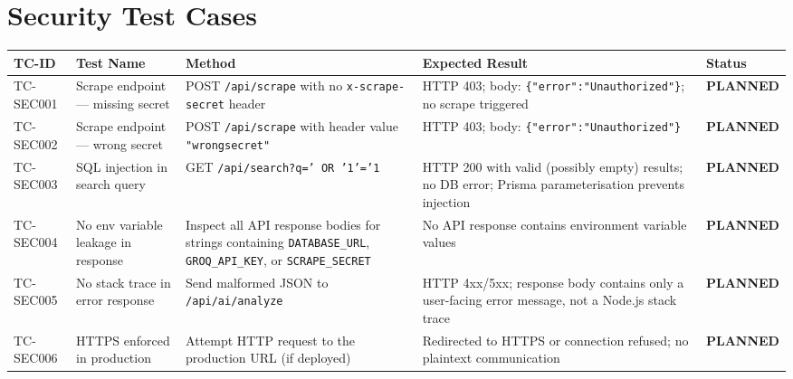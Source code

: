 \documentclass[12pt,a4paper]{report}
\newcommand{\PEND}{\textcolor{pendyellow}{\textbf{PLANNED}}}
\begin{document}
\chapter{Security Test Cases}

\begin{longtable}{C{1.6cm} L{3.5cm} L{3.5cm} L{3.5cm} C{1.5cm}}
  \toprule
  \textbf{TC-ID} & \textbf{Test Name} & \textbf{Method} & \textbf{Expected Result} & \textbf{Status} \\
  \midrule
  \endhead
  \bottomrule
  \endlastfoot

  TC-SEC001 &
    Scrape endpoint --- missing secret &
    POST \texttt{/api/scrape} with no \texttt{x-scrape-secret} header &
    HTTP 403; body: \texttt{\{"error":"Unauthorized"\}}; no scrape triggered &
    \PEND \\

  TC-SEC002 &
    Scrape endpoint --- wrong secret &
    POST \texttt{/api/scrape} with header value \texttt{"wrongsecret"} &
    HTTP 403; body: \texttt{\{"error":"Unauthorized"\}} &
    \PEND \\

  TC-SEC003 &
    SQL injection in search query &
    GET \texttt{/api/search?q=' OR '1'='1} &
    HTTP 200 with valid (possibly empty) results; no DB error; Prisma
    parameterisation prevents injection &
    \PEND \\

  TC-SEC004 &
    No env variable leakage in response &
    Inspect all API response bodies for strings containing
    \texttt{DATABASE\_URL}, \texttt{GROQ\_API\_KEY}, or \texttt{SCRAPE\_SECRET} &
    No API response contains environment variable values &
    \PEND \\

  TC-SEC005 &
    No stack trace in error response &
    Send malformed JSON to \texttt{/api/ai/analyze} &
    HTTP 4xx/5xx; response body contains only a user-facing error message,
    not a Node.js stack trace &
    \PEND \\

  TC-SEC006 &
    HTTPS enforced in production &
    Attempt HTTP request to the production URL (if deployed) &
    Redirected to HTTPS or connection refused; no plaintext communication &
    \PEND \\

\end{longtable}
\end{document}
